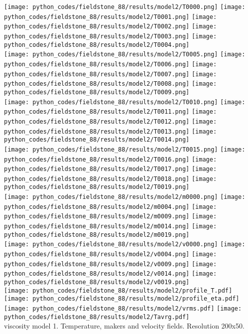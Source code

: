 \begin{center}
\texttt{[image: python\_codes/fieldstone\_88/results/model2/T0000.png]}
\texttt{[image: python\_codes/fieldstone\_88/results/model2/T0001.png]}
\texttt{[image: python\_codes/fieldstone\_88/results/model2/T0002.png]}
\texttt{[image: python\_codes/fieldstone\_88/results/model2/T0003.png]}
\texttt{[image: python\_codes/fieldstone\_88/results/model2/T0004.png]}\\
\texttt{[image: python\_codes/fieldstone\_88/results/model2/T0005.png]}
\texttt{[image: python\_codes/fieldstone\_88/results/model2/T0006.png]}
\texttt{[image: python\_codes/fieldstone\_88/results/model2/T0007.png]}
\texttt{[image: python\_codes/fieldstone\_88/results/model2/T0008.png]}
\texttt{[image: python\_codes/fieldstone\_88/results/model2/T0009.png]}\\
\texttt{[image: python\_codes/fieldstone\_88/results/model2/T0010.png]}
\texttt{[image: python\_codes/fieldstone\_88/results/model2/T0011.png]}
\texttt{[image: python\_codes/fieldstone\_88/results/model2/T0012.png]}
\texttt{[image: python\_codes/fieldstone\_88/results/model2/T0013.png]}
\texttt{[image: python\_codes/fieldstone\_88/results/model2/T0014.png]}\\
\texttt{[image: python\_codes/fieldstone\_88/results/model2/T0015.png]}
\texttt{[image: python\_codes/fieldstone\_88/results/model2/T0016.png]}
\texttt{[image: python\_codes/fieldstone\_88/results/model2/T0017.png]}
\texttt{[image: python\_codes/fieldstone\_88/results/model2/T0018.png]}
\texttt{[image: python\_codes/fieldstone\_88/results/model2/T0019.png]}\\
\texttt{[image: python\_codes/fieldstone\_88/results/model2/m0000.png]}
\texttt{[image: python\_codes/fieldstone\_88/results/model2/m0004.png]}
\texttt{[image: python\_codes/fieldstone\_88/results/model2/m0009.png]}
\texttt{[image: python\_codes/fieldstone\_88/results/model2/m0014.png]}
\texttt{[image: python\_codes/fieldstone\_88/results/model2/m0019.png]}\\
\texttt{[image: python\_codes/fieldstone\_88/results/model2/v0000.png]}
\texttt{[image: python\_codes/fieldstone\_88/results/model2/v0004.png]}
\texttt{[image: python\_codes/fieldstone\_88/results/model2/v0009.png]}
\texttt{[image: python\_codes/fieldstone\_88/results/model2/v0014.png]}
\texttt{[image: python\_codes/fieldstone\_88/results/model2/v0019.png]}\\
\texttt{[image: python\_codes/fieldstone\_88/results/model2/profile\_T.pdf]}
\texttt{[image: python\_codes/fieldstone\_88/results/model2/profile\_eta.pdf]}
\texttt{[image: python\_codes/fieldstone\_88/results/model2/vrms.pdf]}
\texttt{[image: python\_codes/fieldstone\_88/results/model2/Tavrg.pdf]}\\
{\captionfont viscosity model 1. Temperature, makers and velocity fields. Resolution 200x50.}
\end{center} 


